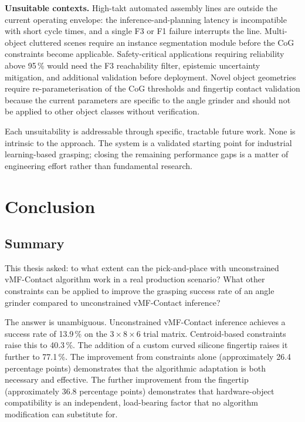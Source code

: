 \documentclass[12pt, a4paper]{report}
\begin{document}
\textbf{Unsuitable contexts.} High-takt automated assembly lines are outside the current operating envelope: the inference-and-planning latency is incompatible with short cycle times, and a single F3 or F1 failure interrupts the line. Multi-object cluttered scenes require an instance segmentation module before the CoG constraints become applicable. Safety-critical applications requiring reliability above 95\,\% would need the F3 reachability filter, epistemic uncertainty mitigation, and additional validation before deployment. Novel object geometries require re-parameterisation of the CoG thresholds and fingertip contact validation because the current parameters are specific to the angle grinder and should not be applied to other object classes without verification.

Each unsuitability is addressable through specific, tractable future work. None is intrinsic to the approach. The system is a validated starting point for industrial learning-based grasping; closing the remaining performance gaps is a matter of engineering effort rather than fundamental research.


\chapter{Conclusion}
\label{chap:conclusion}

\section{Summary}
\label{sec:conclusion-summary}

This thesis asked: to what extent can the pick-and-place with unconstrained vMF-Contact algorithm work in a real production scenario? What other constraints can be applied to improve the grasping success rate of an angle grinder compared to unconstrained vMF-Contact inference?

The answer is unambiguous. 
Unconstrained vMF-Contact inference achieves a success rate of 13.9\,\% on the $3 \times 8 \times 6$ trial matrix. Centroid-based constraints raise this to 40.3\,\%. The addition of a custom curved silicone fingertip raises it further to 77.1\,\%. The improvement from constraints alone (approximately 26.4 percentage points) demonstrates that the algorithmic adaptation is both necessary and effective. 
The further improvement from the fingertip (approximately 36.8 percentage points) demonstrates that hardware-object compatibility is an independent, load-bearing factor that no algorithm modification can substitute for.
\end{document}
